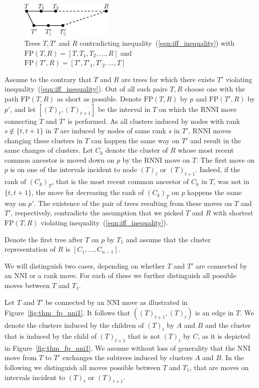 \documentclass{amsart}
\newcommand{\rnni}{\mathrm{RNNI}}
\newcommand{\nni}{\mathrm{NNI}}
\newcommand{\fp}{\mathrm{FP}}
\begin{document}
\begin{figure}[!hbt]
\centering
\includegraphics[width=0.4\textwidth]{proof_idea}
\vspace{12pt}
\caption{Trees $T, T'$ and $R$ contradicting inequality~(\ref{eqn:iff_inequality}) with $\fp(T,R) = [T,T_1,T_2, \ldots, R]$ and $\fp(T',R) = [T',T'_1,T'_2, \ldots, T]$}
\label{fig:proof_idea}
\end{figure}

Assume to the contrary that $T$ and $R$ are trees for which there exists $T'$ violating inequality~(\ref{eqn:iff_inequality}).
Out of all such pairs $T, R$ choose one with the path $\fp(T, R)$ as short as possible.
Denote $\fp(T,R)$ by $p$ and $\fp(T', R)$ by $p'$, and let $[(T)_t, (T)_{t+1}]$ be the interval in $T$ on which the $\rnni$ move connecting $T$ and $T'$ is performed.
As all clusters induced by nodes with rank $s \notin \{t, t+1\}$ in $T$ are induced by nodes of same rank $s$ in $T'$, $\rnni$ moves changing these clusters in $T$ can happen the same way on $T'$ and result in the same changes of clusters.
Let $C_k$ denote the cluster of $R$ whose most recent common ancestor is moved down on $p$ by the $\rnni$ move on $T$.
The first move on $p$ is on one of the intervals incident to node $(T)_t$ or $(T)_{t+1}$.
Indeed, if the rank of $(C_k)_T$, that is the most recent common ancestor of $C_k$ in $T$, was not in $\{t,t+1\}$, the move for decreasing the rank of $(C_k)_T$ on $p$ happens the same way on $p'$.
The existence of the pair of trees resulting from these moves on $T$ and $T'$, respectively, contradicts the assumption that we picked $T$ and $R$ with shortest $\fp(T,R)$ violating inequality~(\ref{eqn:iff_inequality}).

Denote the first tree after $T$ on $p$ by $T_1$ and assume that the cluster representation of $R$ is
$[C_1, \ldots, C_{n-1}]$.

We will distinguish two cases, depending on whether $T$ and $T'$ are connected by an $\nni$ or a rank move.
For each of these we further distinguish all possible moves between $T$ and $T_1$.

Let $T$ and $T'$ be connected by an $\nni$ move as illustrated in Figure~\ref{fig:thm_fp_nni1}.
It follows that $((T)_{t+1},(T)_t)$ is an edge in $T$.
We denote the clusters induced by the children of $(T)_t$ by $A$ and $B$ and the cluster that is induced by the child of $(T)_{t+1}$ that is not $(T)_t$ by $C$, as it is depicted in Figure~\ref{fig:thm_fp_nni1}.
We assume without loss of generality that the $\nni$ move from $T$ to $T'$ exchanges the subtrees induced by clusters $A$ and $B$.
In the following we distinguish all moves possible between $T$ and $T_1$, that are moves on intervals incident to $(T)_t$ or $(T)_{t+1}$.
\end{document}
